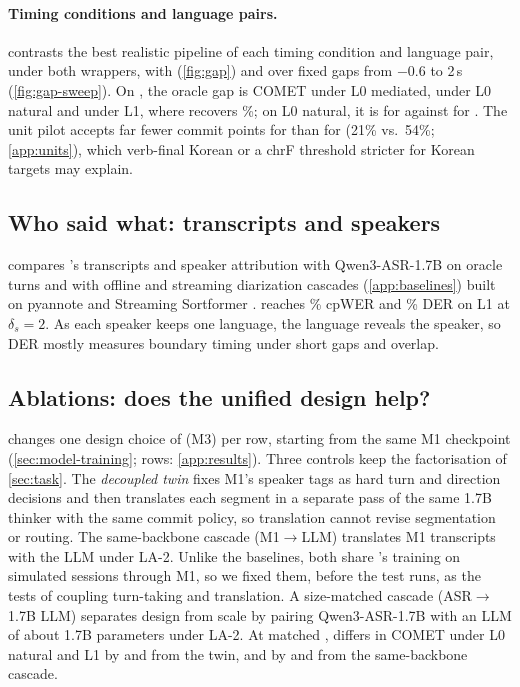 \paragraph{Timing conditions and language pairs.}\label{sec:exp-timing}
 contrasts the best realistic pipeline of each timing condition and language pair, under both wrappers, with \model (\cref{fig:gap}) and over fixed gaps from $-0.6$ to 2\,s (\cref{fig:gap-sweep}).
On \taxi, the oracle gap is \tbdtext{} COMET under L0 mediated, \tbdtext{} under L0 natural and \tbdtext{} under L1, where \model recovers \tbdtext{}\%; on \syn L0 natural, it is \tbdtext{} for  against \tbdtext{} for .
The unit pilot accepts far fewer commit points for \enko than for \koen (21\% vs.\ 54\%; \cref{app:units}), which verb-final Korean or a chrF threshold stricter for Korean targets may explain.

\subsection{Who said what: transcripts and speakers}\label{sec:exp-aux}

 compares \model's transcripts and speaker attribution with Qwen3-ASR-1.7B on oracle turns and with offline and streaming diarization cascades (\cref{app:baselines}) built on pyannote \citep{bredin2023pyannote} and Streaming Sortformer \citep{park2025sortformer,medennikov2025streaming}.
\model reaches \tbdtext{}\% cpWER and \tbdtext{}\% DER on \taxi L1 at $\delta_s=2$.
As each speaker keeps one language, the language reveals the speaker, so DER mostly measures boundary timing under short gaps and overlap.

\subsection{Ablations: does the unified design help?}\label{sec:exp-ablation}



 changes one design choice of \model (M3) per row, starting from the same M1 checkpoint (\cref{sec:model-training}; rows: \cref{app:results}).
Three controls keep the factorisation of \cref{sec:task}.
The \emph{decoupled twin} fixes M1's speaker tags as hard turn and direction decisions and then translates each segment in a separate pass of the same 1.7B thinker with the same commit policy, so translation cannot revise segmentation or routing.
The same-backbone cascade (M1$\to$LLM) translates M1 transcripts with the LLM under LA-2.
Unlike the baselines, both share \model's training on simulated sessions through M1, so we fixed them, before the test runs, as the tests of coupling turn-taking and translation.
A size-matched cascade (ASR$\to$1.7B LLM) separates design from scale by pairing Qwen3-ASR-1.7B with an LLM of about 1.7B parameters under LA-2.
At matched \laal, \model differs in COMET under L0 natural and L1 by \tbdtext{} and \tbdtext{} from the twin, and by \tbdtext{} and \tbdtext{} from the same-backbone cascade.

